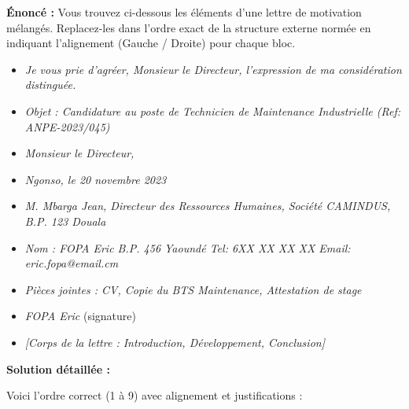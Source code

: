 \documentclass[11pt]{article}
\begin{document}
\begin{exoresolu}
\textbf{Énoncé :} Vous trouvez ci-dessous les éléments d'une lettre de motivation mélangés. Replacez-les dans l'ordre exact de la structure externe normée en indiquant l'alignement (Gauche / Droite) pour chaque bloc.

\begin{itemize}
\item[A.] \textit{Je vous prie d'agréer, Monsieur le Directeur, l'expression de ma considération distinguée.}
\item[B.] \textit{Objet : Candidature au poste de Technicien de Maintenance Industrielle (Ref: ANPE-2023/045)}
\item[C.] \textit{Monsieur le Directeur,}
\item[D.] \textit{Ngonso, le 20 novembre 2023}
\item[E.] \textit{M. Mbarga Jean, Directeur des Ressources Humaines, Société CAMINDUS, B.P. 123 Douala}
\item[F.] \textit{Nom : FOPA Eric \quad B.P. 456 Yaoundé \quad Tel: 6XX XX XX XX \quad Email: eric.fopa@email.cm}
\item[G.] \textit{Pièces jointes : CV, Copie du BTS Maintenance, Attestation de stage}
\item[H.] \textit{FOPA Eric} (signature)
\item[I.] \textit{[Corps de la lettre : Introduction, Développement, Conclusion]}
\end{itemize}

\tcblower
\textbf{Solution détaillée :}

Voici l'ordre correct (1 à 9) avec alignement et justifications :


\end{exoresolu}
\end{document}
